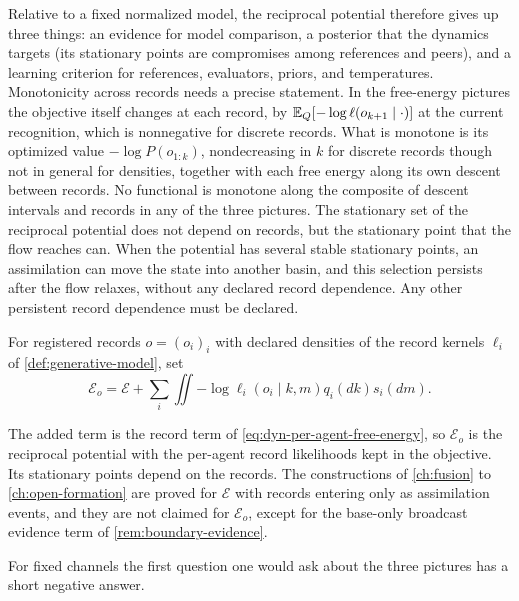 Relative to a fixed normalized model, the reciprocal potential therefore gives up three things: an evidence for model comparison, a posterior that the dynamics targets (its stationary points are compromises among references and peers), and a learning criterion for references, evaluators, priors, and temperatures. Monotonicity across records needs a precise statement. In the free-energy pictures the objective itself changes at each record, by $\mathbb E_Q[-\log\ell(o_{k+1}\mid\cdot)]$ at the current recognition, which is nonnegative for discrete records. What is monotone is its optimized value $-\log P(o_{1:k})$, nondecreasing in $k$ for discrete records though not in general for densities, together with each free energy along its own descent between records. No functional is monotone along the composite of descent intervals and records in any of the three pictures. The stationary set of the reciprocal potential does not depend on records, but the stationary point that the flow reaches can. When the potential has several stable stationary points, an assimilation can move the state into another basin, and this selection persists after the flow relaxes, without any declared record dependence. Any other persistent record dependence must be declared.

For registered records $o=(o_i)_i$ with declared densities of the record kernels $\ell_i$ of \cref{def:generative-model}, set
\begin{equation}
 \mathcal E_o=\mathcal E+\sum_i\iint-\log\ell_i(o_i\mid k,m)q_i(dk)s_i(dm).
 \label{eq:dyn-evidence-potential}
\end{equation}

The added term is the record term of \cref{eq:dyn-per-agent-free-energy}, so $\mathcal E_o$ is the reciprocal potential with the per-agent record likelihoods kept in the objective. Its stationary points depend on the records. The constructions of \cref{ch:fusion} to \cref{ch:open-formation} are proved for $\mathcal E$ with records entering only as assimilation events, and they are not claimed for $\mathcal E_o$, except for the base-only broadcast evidence term of \cref{rem:boundary-evidence}.

For fixed channels the first question one would ask about the three pictures has a short negative answer.

